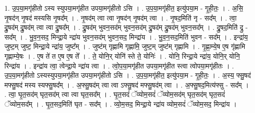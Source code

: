 \documentclass[17pt]{extarticle}
\begin{document}
1. उ॒प॒या॒मगृ॑हीतो ऽस्य स्युपया॒मगृ॑हीत उपया॒मगृ॑हीतो ऽसि । . उ॒प॒या॒मगृ॑हीत॒ इत्यु॑पया॒म - गृ॒ही॒तः॒ । . अ॒सि॒ नृ॒षद॑न् नृ॒षद॑ मस्यसि नृ॒षद᳚म् । . नृ॒षद॑म् त्वा त्वा नृ॒षद॑न् नृ॒षद॑म् त्वा । . नृ॒षद॒मिति॑ नृ - सद᳚म् । . त्वा॒ द्रु॒षद॑म् द्रु॒षद॑म् त्वा त्वा द्रु॒षद᳚म् । . द्रु॒षद॑म् भुवन॒सद॑म् भुवन॒सद॑म् द्रु॒षद॑म् द्रु॒षद॑म् भुवन॒सद᳚म् । . द्रु॒षद॒मिति॑ द्रु - सद᳚म् । . भु॒व॒न॒सद॒ मिन्द्रा॒ये न्द्रा॑य भुवन॒सद॑म् भुवन॒सद॒ मिन्द्रा॑य । . भु॒व॒न॒सद॒मिति॑ भुवन - सद᳚म् । . इन्द्रा॑य॒ जुष्ट॒म् जुष्ट॒ मिन्द्रा॒ये न्द्रा॑य॒ जुष्ट᳚म् । . जुष्ट॑म् गृह्णामि गृह्णामि॒ जुष्ट॒म् जुष्ट॑म् गृह्णामि । . गृ॒ह्णा॒म्ये॒ष ए॒ष गृ॑ह्णामि गृह्णाम्ये॒षः । . ए॒ष ते॑ त ए॒ष ए॒ष ते᳚ । . ते॒ योनि॒र् योनि॑ स्ते ते॒ योनिः॑ । . योनि॒ रिन्द्रा॒ये न्द्रा॑य॒ योनि॒र् योनि॒ रिन्द्रा॑य । . इन्द्रा॑य त्वा॒ त्वेन्द्रा॒ये न्द्रा॑य त्वा । . त्वो॒प॒या॒मगृ॑हीत उपया॒मगृ॑हीत स्त्वा त्वोपया॒मगृ॑हीतः । . उ॒प॒या॒मगृ॑हीतो ऽस्यस्युपया॒मगृ॑हीत उपया॒मगृ॑हीतो ऽसि । . उ॒प॒या॒मगृ॑हीत॒ इत्यु॑पया॒म - गृ॒ही॒तः॒ । . अ॒स्य॒ फ्सु॒षद॑ मफ्सु॒षद॑ मस्य स्यफ्सु॒षद᳚म् । . अ॒फ्सु॒षद॑म् त्वा त्वा ऽफ्सु॒षद॑ मफ्सु॒षद॑म् त्वा । . अ॒फ्सु॒षद॒मित्य॑फ्सु - सद᳚म् । . त्वा॒ घृ॒त॒सद॑म् घृत॒सद॑म् त्वा त्वा घृत॒सद᳚म् । . घृ॒त॒सदं॑ ॅव्योम॒सदं॑ ॅव्योम॒सद॑म् घृत॒सद॑म् घृत॒सदं॑ ॅव्योम॒सद᳚म् । . घृ॒त॒सद॒मिति॑ घृत - सद᳚म् । . व्यो॒म॒सद॒ मिन्द्रा॒ये न्द्रा॑य व्योम॒सदं॑ ॅव्योम॒सद॒ मिन्द्रा॑य । \newline
\end{document}
